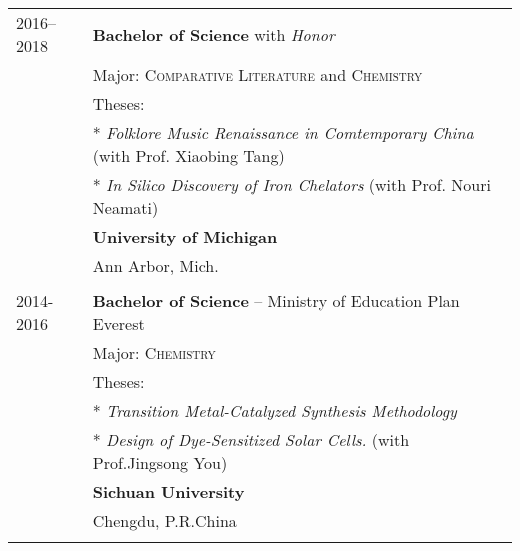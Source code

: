 \begin{longtable}{p{} p{} }
 \textsc{2016--2018}  & \textbf{Bachelor of Science} with \textit{Honor}\\& Major:  \textsc{Comparative Literature} and \textsc{Chemistry}  \\
 & Theses: \\
 & * \textit{Folklore Music Renaissance in Comtemporary China} (with Prof. Xiaobing Tang)\\
 & * \textit{In Silico Discovery of Iron Chelators} (with Prof. Nouri Neamati) \\
 & \textbf{University of Michigan}\\
 & Ann Arbor, Mich.
\\&\\
2014-2016& \textbf{Bachelor of Science} -- Ministry of Education Plan Everest\\
& Major: \textsc{Chemistry}\\
& Theses: \\
& * \textit{Transition Metal-Catalyzed Synthesis Methodology} \\
& * \textit{Design of Dye-Sensitized Solar Cells.} (with Prof.Jingsong You) \\
&\normalsize\textbf{Sichuan University} \\
& Chengdu, P.R.China\\&\\

\end{longtable}

